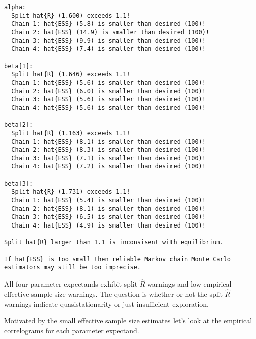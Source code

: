 \documentclass[
  letterpaper,
  DIV=11,
  numbers=noendperiod]{scrartcl}
\begin{document}
\begin{verbatim}
alpha:
  Split hat{R} (1.600) exceeds 1.1!
  Chain 1: hat{ESS} (5.8) is smaller than desired (100)!
  Chain 2: hat{ESS} (14.9) is smaller than desired (100)!
  Chain 3: hat{ESS} (9.9) is smaller than desired (100)!
  Chain 4: hat{ESS} (7.4) is smaller than desired (100)!

beta[1]:
  Split hat{R} (1.646) exceeds 1.1!
  Chain 1: hat{ESS} (5.6) is smaller than desired (100)!
  Chain 2: hat{ESS} (6.0) is smaller than desired (100)!
  Chain 3: hat{ESS} (5.6) is smaller than desired (100)!
  Chain 4: hat{ESS} (5.6) is smaller than desired (100)!

beta[2]:
  Split hat{R} (1.163) exceeds 1.1!
  Chain 1: hat{ESS} (8.1) is smaller than desired (100)!
  Chain 2: hat{ESS} (8.3) is smaller than desired (100)!
  Chain 3: hat{ESS} (7.1) is smaller than desired (100)!
  Chain 4: hat{ESS} (7.2) is smaller than desired (100)!

beta[3]:
  Split hat{R} (1.731) exceeds 1.1!
  Chain 1: hat{ESS} (5.4) is smaller than desired (100)!
  Chain 2: hat{ESS} (8.1) is smaller than desired (100)!
  Chain 3: hat{ESS} (6.5) is smaller than desired (100)!
  Chain 4: hat{ESS} (4.9) is smaller than desired (100)!

Split hat{R} larger than 1.1 is inconsisent with equilibrium.

If hat{ESS} is too small then reliable Markov chain Monte Carlo estimators may still be too imprecise.

\end{verbatim}

All four parameter expectands exhibit split \(\hat{R}\) warnings and low
empirical effective sample size warnings. The question is whether or not
the split \(\hat{R}\) warnings indicate quasistationarity or just
insufficient exploration.

Motivated by the small effective sample size estimates let's look at the
empirical correlograms for each parameter expectand.
\end{document}
